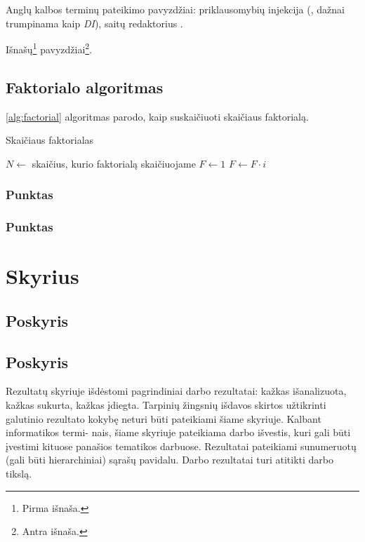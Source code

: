 \documentclass[
    monochrome, %
]{VUMIFSEMasterThesis}
\begin{document}
Anglų kalbos terminų pateikimo pavyzdžiai: priklausomybių injekcija (,
dažnai trumpinama kaip \textit{DI}), saitų redaktorius .

Išnašų\footnote{Pirma išnaša.} pavyzdžiai\footnote{Antra išnaša.}.

\subsection{Faktorialo algoritmas}

\ref{alg:factorial} algoritmas parodo, kaip suskaičiuoti skaičiaus faktorialą.

\begin{algorithm}
\caption{Skaičiaus faktorialas}
\begin{algorithmic}[1] %
\State $N\gets$ skaičius, kurio faktorialą skaičiuojame
\State $F\gets 1$
    \State $F\gets F \cdot i$
\EndFor
\end{algorithmic}
\label{alg:factorial}
\end{algorithm}

\subsubsection{Punktas}
\subsubsection{Punktas}
\section{Skyrius}
\subsection{Poskyris}
\subsection{Poskyris}

Rezultatų skyriuje išdėstomi pagrindiniai darbo rezultatai: kažkas išanalizuota,
kažkas sukurta, kažkas įdiegta. Tarpinių žingsnių išdavos skirtos užtikrinti galutinio
rezultato kokybę neturi būti pateikiami šiame skyriuje. Kalbant informatikos termi-
nais, šiame skyriuje pateikiama darbo išvestis, kuri gali būti įvestimi kituose panašios
tematikos darbuose. Rezultatai pateikiami sunumeruotų (gali būti hierarchiniai) sąrašų
pavidalu. Darbo rezultatai turi atitikti darbo tikslą.
\end{document}
